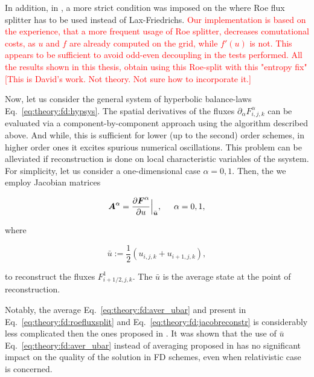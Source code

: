 In addition, in \citet{LeVeque:1992}, a more strict condition was imposed on the where Roe flux splitter has to be used instead of Lax-Friedrichs. 
\textcolor{red}{
    Our implementation is based on the experience, that a more frequent usage of Roe splitter, decreases comutational costs, as $u$ and $f$ are already computed on the grid, while $f'(u)$ is not. This appears to be sufficient to avoid odd-even decoupling in the tests performed. All the results shown in this thesis, obtain using this Roe-split with this "entropy fix" [This is David's work. Not theory. Not sure how to incorporate it.]
} 

Now, let us consider the general system of hyperbolic balance-laws Eq.~\eqref{eq:theory:fd:hypsys}. The spatial derivatives of the fluxes $\partial_{\alpha} F_{i,j,k} ^{\alpha}$ can be evaluated via a component-by-component approach using the algorithm described above. And while, this is sufficient for lower (up to the second) order schemes, in higher order ones it excites spurious numerical oscillations.
This problem can be alleviated if reconstruction is done on local characteristic variables of the ssystem. 
For simplicity, let us consider a one-dimensional case $\alpha={0,1}$. Then, the we employ Jacobian matrices

\begin{equation}
\boldsymbol{A}^{\alpha} = \frac{\partial \boldsymbol{F}^{\alpha}}{\partial u}\Big|_{\bar{\boldsymbol{u}}}, \hspace{5mm} \alpha = 0,1,
\label{eq:theory:fd:jacobreconstr}
\end{equation}

where 

\begin{equation}
\bar{u} := \frac{1}{2}(u_{i,j,k} + u_{i+1,j,k}),
\label{eq:theory:fd:aver_ubar}
\end{equation}

to reconstruct the fluxes $F^1 _{i+1/2, j, k}$. The $\bar{u}$ is the average state at the point of reconstruction. 

Notably, the average Eq.~\eqref{eq:theory:fd:aver_ubar} and present in Eq.~\eqref{eq:theory:fd:roefluxsplit} and Eq.~\eqref{eq:theory:fd:jacobreconstr} is considerably less complicated then the ones proposed in \citet{Roe:1981}. It was shown that the use of $\bar{u}$ Eq.~\eqref{eq:theory:fd:aver_ubar} instead of averaging proposed in \citet{Roe:1981} has no significant impact on the quality of the solution in \ac{FD} schemes, even when relativistic case is concerned. 

